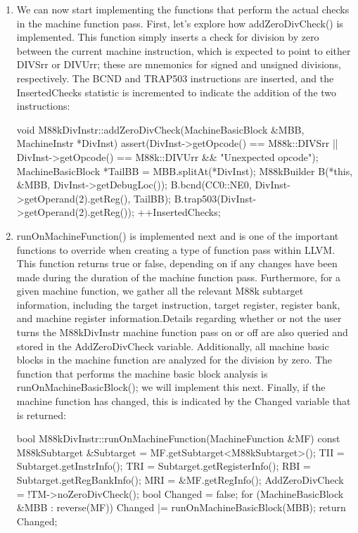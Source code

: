 \begin{enumerate}
\item
We can now start implementing the functions that perform the actual checks in the machine function pass. First, let’s explore how addZeroDivCheck() is implemented. This function simply inserts a check for division by zero between the current machine instruction, which is expected to point to either DIVSrr or DIVUrr; these are mnemonics for signed and unsigned divisions, respectively. The BCND and TRAP503 instructions are inserted, and the InsertedChecks statistic is incremented to indicate the addition of the two instructions:

\begin{cpp}
void M88kDivInstr::addZeroDivCheck(MachineBasicBlock &MBB,
                                   MachineInstr *DivInst) {
    assert(DivInst->getOpcode() == M88k::DIVSrr ||
            DivInst->getOpcode() == M88k::DIVUrr && "Unexpected
            opcode");
    MachineBasicBlock *TailBB = MBB.splitAt(*DivInst);
    M88kBuilder B(*this, &MBB, DivInst->getDebugLoc());
    B.bcnd(CC0::NE0, DivInst->getOperand(2).getReg(), TailBB);
    B.trap503(DivInst->getOperand(2).getReg());
    ++InsertedChecks;
}
\end{cpp}

\item
runOnMachineFunction() is implemented next and is one of the important functions to override when creating a type of function pass within LLVM. This function returns true or false, depending on if any changes have been made during the duration of the machine function pass. Furthermore, for a given machine function, we gather all the relevant M88k subtarget information, including the target instruction, target register, register bank, and machine register information.Details regarding whether or not the user turns the M88kDivInstr machine function pass on or off are also queried and stored in the AddZeroDivCheck variable. Additionally, all machine basic blocks in the machine function are analyzed for the division by zero. The function that performs the machine basic block analysis is runOnMachineBasicBlock(); we will implement this next. Finally, if the machine function has changed, this is indicated by the Changed variable that is returned:

\begin{cpp}
bool M88kDivInstr::runOnMachineFunction(MachineFunction &MF) {
    const M88kSubtarget &Subtarget =
    MF.getSubtarget<M88kSubtarget>();
    TII = Subtarget.getInstrInfo();
    TRI = Subtarget.getRegisterInfo();
    RBI = Subtarget.getRegBankInfo();
    MRI = &MF.getRegInfo();
    AddZeroDivCheck = !TM->noZeroDivCheck();
    bool Changed = false;
    for (MachineBasicBlock &MBB : reverse(MF))
        Changed |= runOnMachineBasicBlock(MBB);
    return Changed;
}
\end{cpp}


\end{enumerate}
